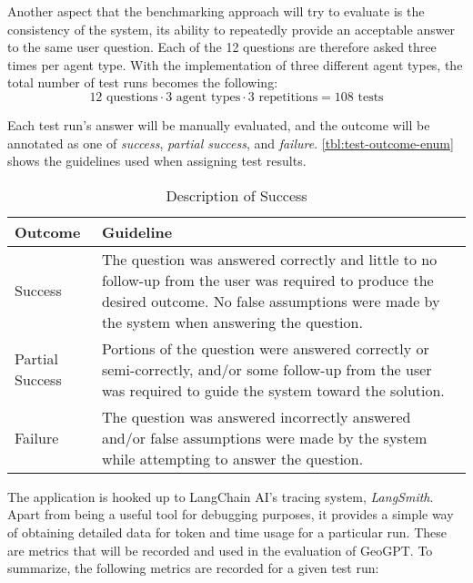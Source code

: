 Another aspect that the benchmarking approach will try to evaluate is the consistency of the system, its ability to repeatedly provide an acceptable answer to the same user question. Each of the 12 questions are therefore asked three times per agent type. With the implementation of three different agent types, the total number of test runs becomes the following: $$12 \text{ questions} \cdot 3 \text{ agent types} \cdot 3 \text{ repetitions} = 108 \text{ tests}$$

Each test run's answer will be manually evaluated, and the outcome will be annotated as one of \textit{success}, \textit{partial success}, and \textit{failure}. \autoref{tbl:test-outcome-enum} shows the guidelines used when assigning test results.

\begin{table}[htbp]
    \centering
    \caption{Description of Success}
    \label{tbl:test-outcome-enum}
    \begin{tabularx}{0.8\textwidth}{p{3cm}X}
        \toprule
        \textbf{Outcome} & \textbf{Guideline}                                                                                                                                                                                  \\
        \midrule
        Success          & The question was answered correctly and little to no follow-up from the user was required to produce the desired outcome. No false assumptions were made by the system when answering the question. \\
        \midrule
        Partial Success  & Portions of the question were answered correctly or semi-correctly, and/or some follow-up from the user was required to guide the system toward the solution.                                       \\
        \midrule
        Failure          & The question was answered incorrectly answered and/or false assumptions were made by the system while attempting to answer the question.                                                            \\
        \bottomrule
    \end{tabularx}
\end{table}


The application is hooked up to LangChain AI's tracing system, \textit{LangSmith}. Apart from being a useful tool for debugging purposes, it provides a simple way of obtaining detailed data for token and time usage for a particular run. These are metrics that will be recorded and used in the evaluation of GeoGPT. To summarize, the following metrics are recorded for a given test run:

